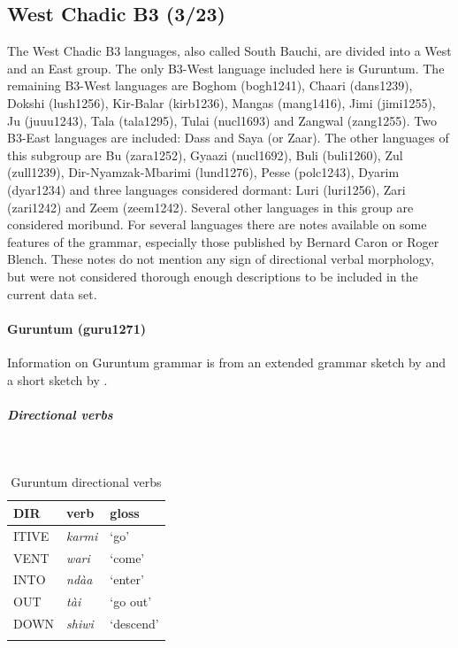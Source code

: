 \subsection{West Chadic B3 (3/23)}
\sloppy
The West Chadic B3 languages, also called South Bauchi, are divided into a West and an East group. The only B3-West language included here is Guruntum. The remaining B3-West languages are Boghom (bogh1241), Chaari (dans1239), Dokshi (lush1256), Kir-Balar (kirb1236), Mangas (mang1416), Jimi (jimi1255), Ju (juuu1243), Tala (tala1295), Tulai (nucl1693) and Zangwal (zang1255). Two B3-East languages are included: Dass and Saya (or Zaar). The other languages of this subgroup are
Bu (zara1252),
Gyaazi (nucl1692),
Buli (buli1260),
Zul (zull1239),
Dir-Nyamzak-Mbarimi (lund1276),
Pesse (polc1243),
Dyarim (dyar1234) and three languages considered dormant: Luri (luri1256), Zari (zari1242) and Zeem (zeem1242). Several other languages in this group are considered moribund. For several languages there are notes available on some features of the grammar, especially those published by Bernard Caron or Roger Blench. These notes do not mention any sign of directional verbal morphology, but were not considered thorough enough descriptions to be included in the current data set.
\fussy

\paragraph*{Guruntum (guru1271)} \label{guru}

Information on Guruntum grammar is from an extended grammar sketch by \citet{harunaGrammaticalOutlineGurdung2003} and a short sketch by \citet{jaggarGuruntumGurdungWest1988}. 

\subparagraph{Directional verbs}~



\begin{table}[H]
	\caption{Guruntum directional verbs} 
	\label{tab:guruV}
	\begin{tabular}{lll} %
		\lsptoprule
		DIR & verb & gloss   \\ %
		\midrule
		ITIVE & \textit{karmi} & `go' \\
		VENT & \textit{wari} & `come' \\
		INTO& \textit{ndàa} & `enter' \\
		OUT & \textit{tài} & `go out' \\
		DOWN & \textit{shiwi} & `descend' \\
		\lspbottomrule
	\end{tabular}
\end{table}

